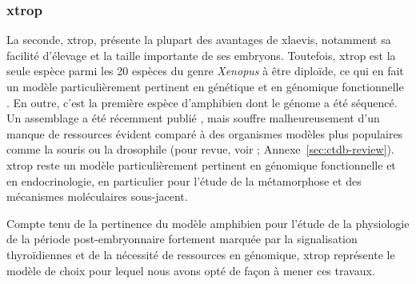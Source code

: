 \documentclass[../main.tex]{subfiles}
\begin{document}
\subsubsection{\gls{xtrop}}
La seconde, \gls{xtrop}, présente la plupart des avantages de \gls{xlaevis}, notamment sa facilité d'élevage et la taille importante de ses embryons.
Toutefois, \gls{xtrop} est la seule espèce parmi les 20 espèces du genre \textit{Xenopus} à être diploïde, ce qui en fait un modèle particulièrement pertinent en génétique et en génomique fonctionnelle \citep{Amaya2005}.
En outre, c'est la première espèce d'amphibien dont le génome a été séquencé.
Un assemblage a été récemment publié \citep{Hellsten2010a}, mais souffre malheureusement d'un manque de ressources évident comparé à des organismes modèles plus populaires comme la souris ou la drosophile (pour revue, voir \citet{Grimaldi2013}; Annexe~\ref{sec:ctdb-review}).
\gls{xtrop} reste un modèle particulièrement pertinent en génomique fonctionnelle et en endocrinologie, en particulier pour l'étude de la métamorphose et des mécanismes moléculaires sous-jacent.
\par
Compte tenu de la pertinence du modèle amphibien pour l'étude de la physiologie de la période post-embryonnaire fortement marquée par la signalisation thyroïdiennes et de la nécessité de ressources en génomique, \gls{xtrop} représente le modèle de choix pour lequel nous avons opté de façon à mener ces travaux.

\end{document}
